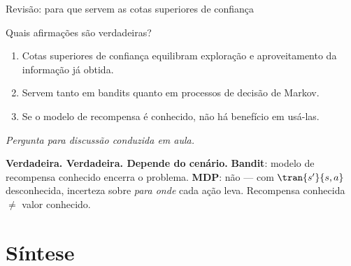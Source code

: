 \documentclass[aspectratio=169, 10pt]{beamer}
\newcommand{\paradiscussao}{\smallskip
  {\footnotesize\color{rlCinza}\itshape Pergunta para discussão conduzida em aula.}}
\begin{document}
\begin{frame}{Revisão: para que servem as cotas superiores de confiança}
  \footnotesize
  \begin{quizbox}{}
    Quais afirmações são verdadeiras?
    \smallskip
    \begin{enumerate}\setlength{\itemsep}{0em}
      \item Cotas superiores de confiança equilibram exploração e aproveitamento
            da informação já obtida.
      \item Servem tanto em bandits quanto em processos de decisão de Markov.
      \item Se o modelo de recompensa é conhecido, não há benefício em usá-las.
    \end{enumerate}
    \paradiscussao
  \end{quizbox}

  \pause
  \begin{respbox}
    \textbf{Verdadeira. Verdadeira. Depende do cenário.}
    \textbf{Bandit}: modelo de recompensa conhecido encerra o problema.
    \textbf{MDP}: não — com $\tran{s'}{s,a}$ desconhecida, incerteza sobre
    \emph{para onde} cada ação leva. Recompensa conhecida $\neq$ valor conhecido.
  \end{respbox}
\end{frame}

\section{Síntese}
\end{document}
